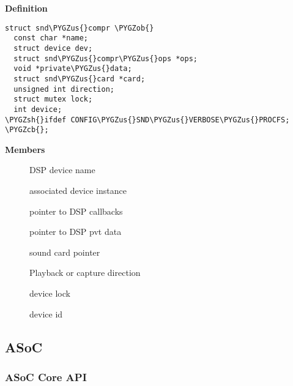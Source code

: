 \documentclass[a4paper,8pt,english]{sphinxmanual}
\def\PYGZus{\char`\_}
\def\PYGZob{\char`\{}
\def\PYGZcb{\char`\}}
\def\PYGZsh{\char`\#}
\begin{document}
\begin{fulllineitems}
\label{sound/kernel-api/alsa-driver-api:c.snd_compr}
\end{fulllineitems}


\textbf{Definition}

\begin{Verbatim}[commandchars=\\\{\}]
struct snd\PYGZus{}compr \PYGZob{}
  const char *name;
  struct device dev;
  struct snd\PYGZus{}compr\PYGZus{}ops *ops;
  void *private\PYGZus{}data;
  struct snd\PYGZus{}card *card;
  unsigned int direction;
  struct mutex lock;
  int device;
\PYGZsh{}ifdef CONFIG\PYGZus{}SND\PYGZus{}VERBOSE\PYGZus{}PROCFS;
\PYGZcb{};
\end{Verbatim}

\textbf{Members}
\begin{description}
\item[{}] \leavevmode
DSP device name

\item[{}] \leavevmode
associated device instance

\item[{}] \leavevmode
pointer to DSP callbacks

\item[{}] \leavevmode
pointer to DSP pvt data

\item[{}] \leavevmode
sound card pointer

\item[{}] \leavevmode
Playback or capture direction

\item[{}] \leavevmode
device lock

\item[{}] \leavevmode
device id

\end{description}


\subsection{ASoC}
\label{sound/kernel-api/alsa-driver-api:asoc}

\subsubsection{ASoC Core API}
\label{sound/kernel-api/alsa-driver-api:asoc-core-api}
\end{document}
